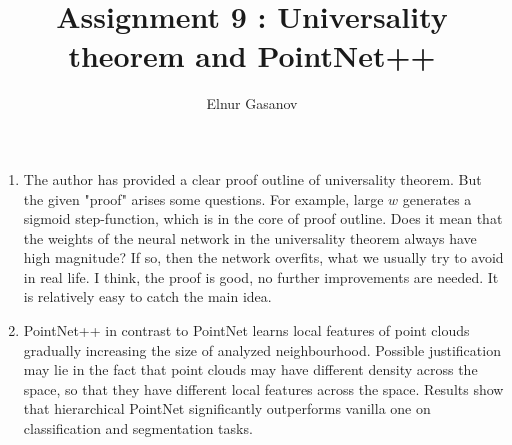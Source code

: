 \documentclass{article}
\title{Assignment 9 : Universality theorem and PointNet++}
\author{Elnur Gasanov}
\date{}
\begin{document}
\maketitle
\begin{enumerate}
	\item The author has provided a clear proof outline of universality theorem. But the given "proof" arises some questions. For example, large $w$ generates a sigmoid step-function, which is in the core of proof outline. Does it mean that the weights of the neural network  in the universality theorem always have high magnitude? If so, then the network overfits, what we usually try to avoid in real life. I think, the proof is good, no further improvements are needed. It is relatively easy to catch the main idea. 
	\item PointNet++ in contrast to PointNet learns local features of point clouds gradually increasing the size of analyzed neighbourhood. Possible justification may lie in the fact that point clouds may have different density across the space, so that they have different local features across the space. Results show that hierarchical PointNet significantly outperforms vanilla one on classification and segmentation tasks. 
	
\end{enumerate}
\end{document}
